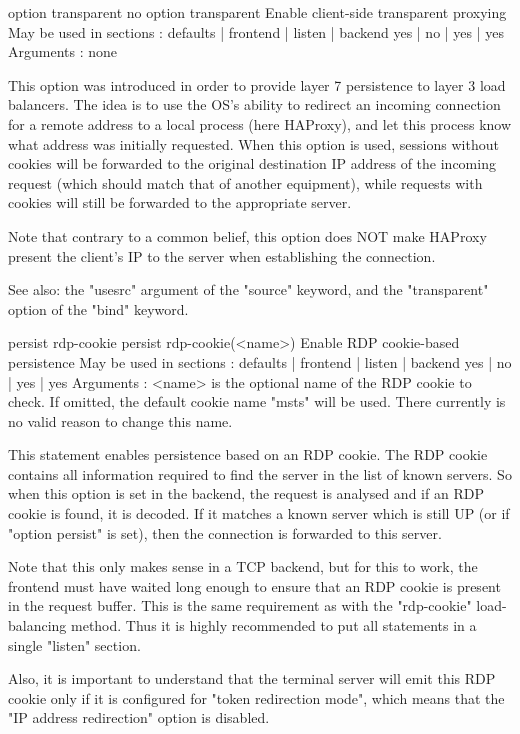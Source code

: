 option transparent
no option transparent
  Enable client-side transparent proxying
  May be used in sections :   defaults | frontend | listen | backend
                                 yes   |    no    |   yes  |   yes
  Arguments : none

  This option was introduced in order to provide layer 7 persistence to layer 3
  load balancers. The idea is to use the OS's ability to redirect an incoming
  connection for a remote address to a local process (here HAProxy), and let
  this process know what address was initially requested. When this option is
  used, sessions without cookies will be forwarded to the original destination
  IP address of the incoming request (which should match that of another
  equipment), while requests with cookies will still be forwarded to the
  appropriate server.

  Note that contrary to a common belief, this option does NOT make HAProxy
  present the client's IP to the server when establishing the connection.

  See also: the "usesrc" argument of the "source" keyword, and the
            "transparent" option of the "bind" keyword.


persist rdp-cookie
persist rdp-cookie(<name>)
  Enable RDP cookie-based persistence
  May be used in sections :   defaults | frontend | listen | backend
                                 yes   |    no    |   yes  |   yes
  Arguments :
    <name>    is the optional name of the RDP cookie to check. If omitted, the
              default cookie name "msts" will be used. There currently is no
              valid reason to change this name.

  This statement enables persistence based on an RDP cookie. The RDP cookie
  contains all information required to find the server in the list of known
  servers. So when this option is set in the backend, the request is analysed
  and if an RDP cookie is found, it is decoded. If it matches a known server
  which is still UP (or if "option persist" is set), then the connection is
  forwarded to this server.

  Note that this only makes sense in a TCP backend, but for this to work, the
  frontend must have waited long enough to ensure that an RDP cookie is present
  in the request buffer. This is the same requirement as with the "rdp-cookie"
  load-balancing method. Thus it is highly recommended to put all statements in
  a single "listen" section.

  Also, it is important to understand that the terminal server will emit this
  RDP cookie only if it is configured for "token redirection mode", which means
  that the "IP address redirection" option is disabled.

